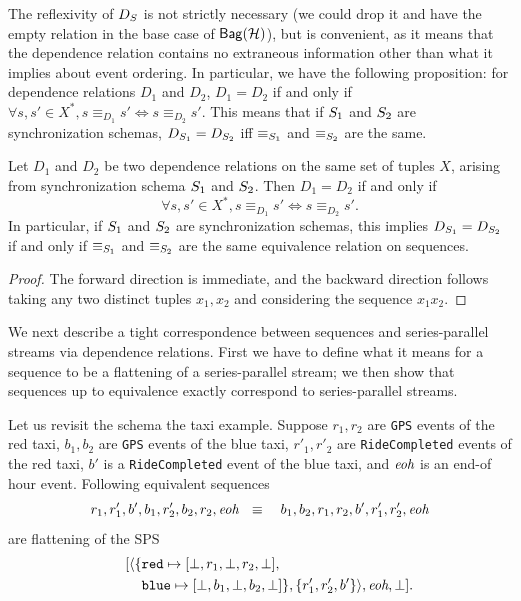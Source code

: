 The reflexivity of $D_{\ss}$ is not strictly necessary (we could drop it and have the empty relation in the base case of $\relleaf{\mathcal{H}}$), but is convenient, as it means that the dependence relation contains no extraneous information other than what it implies about event ordering.
In particular,
we have the following proposition:
for dependence relations $D_1$ and $D_2$, $D_1 = D_2$ if and only if
$\forall s, s' \in X^{*}, s \equiv_{D_1} s' \iff s \equiv_{D_2} s'$.
This means that if $\ss_1$ and $\ss_2$ are synchronization schemas,
$D_{\ss_1} = D_{\ss_2}$ iff $\equiv_{\ss_1}$ and $\equiv_{\ss_2}$ are the same.

\begin{proposition}
Let $D_1$ and $D_2$ be two dependence relations on the same set of tuples $X$,
arising from synchronization schema $\ss_1$ and $\ss_2$.
Then $D_1 = D_2$ if and only if
\[
    \forall s, s' \in X^{*}, s \equiv_{D_1} s' \iff s \equiv_{D_2} s'.
\]
In particular, if $\ss_1$ and $\ss_2$ are synchronization schemas, this implies
$D_{\ss_1} = D_{\ss_2}$ if and only if $\equiv_{\ss_1}$ and $\equiv_{\ss_2}$ are the same equivalence relation on sequences.
\end{proposition}
\begin{proof}
The forward direction is immediate, and the backward direction follows
taking any two distinct tuples $x_1, x_2$ and considering the sequence $x_1 x_2$.
\end{proof}

We next describe a tight correspondence between sequences and series-parallel streams via dependence relations. First we have to define what it means for a sequence to be a flattening of a series-parallel stream; we then show that sequences up to equivalence exactly correspond to series-parallel streams.

\begin{example}
\label{ex:gps-flatten}
Let us revisit the schema the taxi example.
Suppose $r_1, r_2$ are \texttt{GPS} events of the red taxi,
$b_1, b_2$ are \texttt{GPS} events of the blue taxi,
$r'_1, r'_2$ are \texttt{RideCompleted} events of the red taxi,
$b'$ is a \texttt{RideCompleted} event of the blue taxi,
and $\eohevent$ is an end-of hour event.
Following equivalent sequences
$$r_1, r'_1, b', b_1, r'_2, b_2, r_2, \eohevent\ \ \equiv\ \ \
b_1, b_2, r_1, r_2, b', r'_1, r'_2, \eohevent$$
are flattening of the SPS
\begin{align*}
~\qquad
[ \spspar{\spsbag{& \keyed{\texttt{red}} {[\spsemp,r_1,\spsemp,r_2,\spsemp]}, \\
& \keyed{\texttt{blue}}{[\spsemp,b_1,\spsemp,b_2,\spsemp]}}}
  {\spsbag{r'_1,r'_2,b'}},
\eohevent, \spsemp
]. \quad \end{align*}
\end{example}

